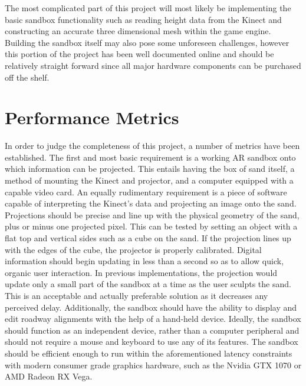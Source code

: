 \documentclass[onecolumn, draftclsnofoot,10pt, compsoc]{IEEEtran}
\begin{document}
The most complicated part of this project will most likely be implementing the basic sandbox functionality such as reading height data from the Kinect and constructing an accurate three dimensional mesh within the game engine. 
Building the sandbox itself may also pose some unforeseen challenges, however this portion of the project has been well documented online and should be relatively straight forward since all major hardware components can be purchased off the shelf.

\section{Performance Metrics}
In order to judge the completeness of this project, a number of metrics have been established.
The first and most basic requirement is a working AR sandbox onto which information can be projected.
This entails having the box of sand itself, a method of mounting the Kinect and projector, and a computer equipped with a capable video card.
An equally rudimentary requirement is a piece of software capable of interpreting the Kinect's data and projecting an image onto the sand.
Projections should be precise and line up with the physical geometry of the sand, plus or minus one projected pixel.
This can be tested by setting an object with a flat top and vertical sides such as a cube on the sand. If the projection lines up with the edges of the cube, the projector is properly calibrated.
Digital information should begin updating in less than a second so as to allow quick, organic user interaction.
In previous implementations, the projection would update only a small part of the sandbox at a time as the user sculpts the sand. This is an acceptable and actually preferable solution as it decreases any perceived delay.
Additionally, the sandbox should have the ability to display and edit roadway alignments with the help of a hand-held device.
Ideally, the sandbox should function as an independent device, rather than a computer peripheral and should not require a mouse and keyboard to use any of its features. 
The sandbox should be efficient enough to run within the aforementioned latency constraints with modern consumer grade graphics hardware, such as the Nvidia GTX 1070 or AMD Radeon RX Vega. 
\end{document}
